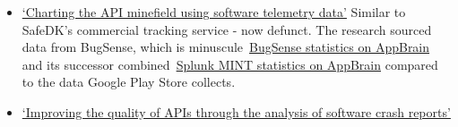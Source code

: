 \begin{enumerate}
\begin{itemize}
        \item \href{https://doi.org/10.1007/s10664-014-9343-7}{`Charting the API minefield using software telemetry data'} Similar to SafeDK's commercial tracking service - now defunct. The research sourced data from BugSense, which is minuscule~\href{https://www.appbrain.com/stats/libraries/details/bugsense/bugsense}{BugSense statistics on AppBrain} and its successor combined~\href{https://www.appbrain.com/stats/libraries/details/splunkmint/splunk-mint}{Splunk MINT statistics on AppBrain} compared to the data Google Play Store collects.
        \item \href{https://doi.org/10.4230/OASIcs.ICCSW.2013.57}{`Improving the quality of APIs through the analysis of software crash reports'}
    \end{itemize}
\end{enumerate}
